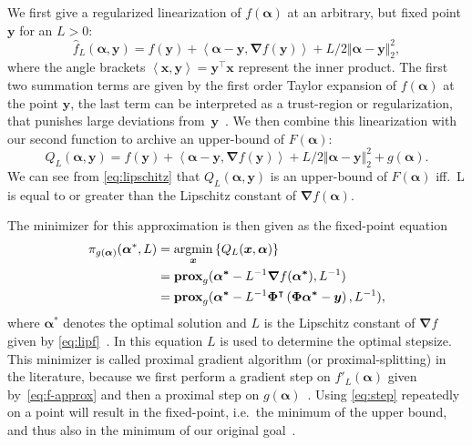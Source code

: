 We first give a regularized linearization of \(f(\bm{\alpha})\) at an arbitrary,
but fixed point \(\bm{y}\) for an \(L > 0\):
\begin{equation}\label{eq:f-approx}
  \hat{f}_L(\bm{\alpha}, \bm{y}) = f(\bm{y}) + \left< \bm{\alpha} - \bm{y}, \bm{\nabla} f (\bm{y}) \right> +
  L/2 \Vert \bm{\alpha} - \bm{y} \Vert_2^2,
\end{equation}
where the angle brackets \( \left< \bm{x}, \bm{y} \right> = \bm{y}^\intercal \bm{x} \) represent the inner product.
The first two summation terms are given by the first order Taylor expansion of \(f(\bm{\alpha})\) at the point \(\bm{y}\), the last term can be interpreted as a trust-region or regularization, that punishes large deviations from~\(\bm{y}\)~\cite{proxsurvey}.
We then combine this linearization with our second function to archive an upper-bound of \(F(\bm{\alpha})\):
\begin{equation}\label{eq:goal-approx}
  Q_L(\bm{\alpha}, \bm{y}) = f(\bm{y}) + \left< \bm{\alpha} - \bm{y}, \bm{\nabla} f (\bm{y}) \right> +
  L/2 \Vert \bm{\alpha} - \bm{y} \Vert_2^2 +
  g(\bm{\alpha}).
\end{equation}
We can see from \cref{eq:lipschitz} that \(Q_L(\bm{\alpha}, \bm{y})\) is an
upper-bound of \(F(\bm{\alpha})\) iff.~L is equal to or greater than the Lipschitz
constant of \(\bm{\nabla} f(\bm{\alpha})\).

The minimizer for this approximation is then given as the fixed-point equation
\begin{align}\label{eq:step}
  \pi_{g(\bm{\alpha})}(\bm{\alpha}^*, L) &=  \argmin_{\bm{x}} \left\{ Q_L(\bm{x}, \bm{\alpha}) \right\}\nonumber\\
       &= \prox[\(g\)]{\bm{\alpha^*} - L^{-1} \bm{\nabla} f (\bm{\alpha^*})}{L^{-1} } \nonumber\\
       &= \prox[\(g\)]{\bm{\alpha^*} - L^{-1} \bm{\Phi}^\intercal \left(\bm{\Phi} \bm{\alpha^*} - \bm{y} \right)}
         {L^{-1}},
\end{align}
where \(\bm{\alpha}^*\) denotes the optimal solution and \(L\) is the Lipschitz constant of \(\bm{\nabla} f\) given by \cref{eq:lipf}~\cite{fista}.
In this equation \(L\) is used to determine the optimal stepsize.
This minimizer is called proximal gradient algorithm (or proximal-splitting) in the literature, because we first perform a gradient step on \(f'_L(\bm{\alpha})\) given by~\ref{eq:f-approx} and then a proximal step on \(g(\bm{\alpha})\)~\cite{proxsurvey}.
Using \cref{eq:step} repeatedly on a point will result in the fixed-point, i.e.~the minimum of the upper bound, and thus also in the minimum of our original goal~\cite{proxsurvey}.


